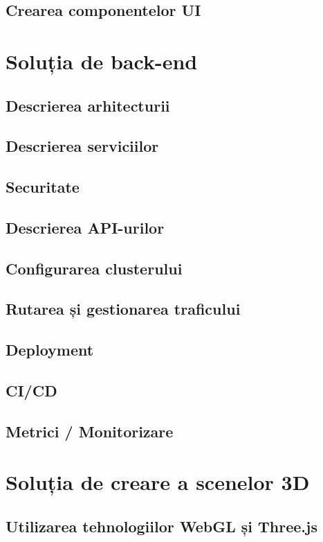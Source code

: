 \subsection{Crearea componentelor UI}

\section{Soluția de back-end}
\label{sec:proj-backend}
\subsection{Descrierea arhitecturii}
\subsection{Descrierea serviciilor}
\subsection{Securitate}
\subsection{Descrierea API-urilor}
\subsection{Configurarea clusterului}
\subsection{Rutarea și gestionarea traficului}
\subsection{Deployment}
\subsection{CI/CD}
\subsection{Metrici / Monitorizare}

\section{Soluția de creare a scenelor 3D}
\label{sec:proj-3d}
\subsection{Utilizarea tehnologiilor WebGL și Three.js}
